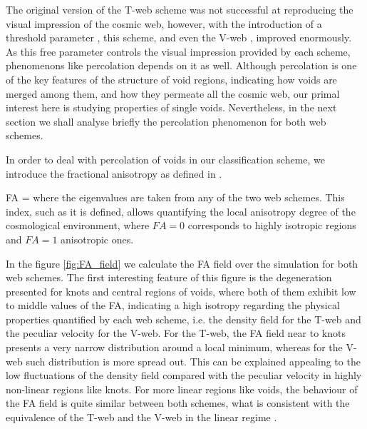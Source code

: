 \documentclass[a4,useAMS,usenatbib,usegraphicx]{latex/mn2e}
\begin{document}
The original version of the T-web scheme  was not
successful at reproducing the visual impression of the cosmic web, 
however, with the introduction of a threshold parameter , this scheme, and even the V-web , improved enormously. As this free parameter controls the visual 
impression provided by each scheme, phenomenons like percolation depends 
on it as well. Although percolation is one of the key features of the 
structure of void regions, indicating how voids are merged among them, and 
how they permeate all the cosmic web, our primal interest here is studying 
properties of single voids. Nevertheless, in the next section we shall 
analyse briefly the percolation phenomenon for both web schemes.


In order to deal with percolation of voids in our classification scheme,
we introduce the fractional anisotropy as defined in .


{ FA =  }
where the eigenvalues are taken from any of the two web schemes. This 
index, such as it is defined, allows quantifying the local anisotropy 
degree of the cosmological environment, where $FA=0$ corresponds to highly
isotropic regions and $FA=1$ anisotropic ones.


In the figure \ref{fig:FA_field} we calculate the FA field over the 
simulation for both web schemes. The first interesting feature of this
figure is the degeneration presented for knots and central regions of 
voids, where both of them exhibit low to middle values of the FA, 
indicating a high isotropy regarding the physical properties quantified by 
each web scheme, i.e. the density field for the T-web and the peculiar 
velocity for the V-web. For the T-web, the FA field near to knots presents 
a very narrow distribution around a local minimum, whereas for the V-web 
such distribution is more spread out. This can be explained appealing to 
the low fluctuations of the density field compared with the peculiar 
velocity in highly non-linear regions like knots. For more linear regions 
like voids, the behaviour of the FA field is quite similar between both 
schemes, what is consistent with the equivalence of the T-web and the 
V-web in the linear regime .
\end{document}
